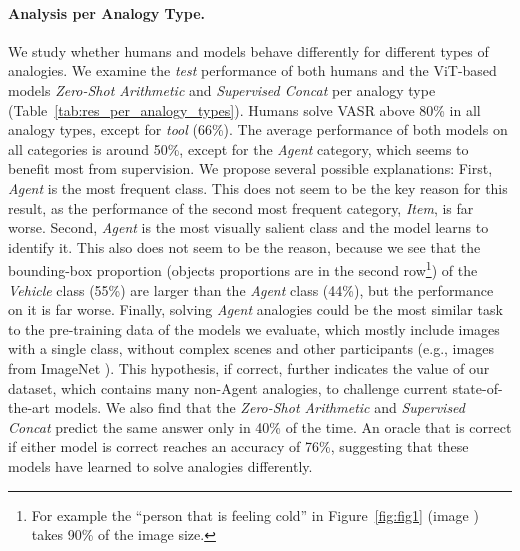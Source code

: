 \documentclass[letterpaper]{article} \usepackage{aaai23}  \usepackage{times}  \usepackage{helvet}  \usepackage{courier}  \usepackage[hyphens]{url}  \usepackage{graphicx} \urlstyle{rm} \def\UrlFont{\rm}  \usepackage{natbib}  \usepackage{caption} \frenchspacing  \setlength{\pdfpagewidth}{8.5in}  \setlength{\pdfpageheight}{11in}  \usepackage{algorithm}
\newcommand{\zeroshot}[0]{\emph{Zero-Shot Arithmetic}}
\newcommand{\trainedconcat}[0]{\emph{Supervised Concat}}
\begin{document}
\paragraph{Analysis per Analogy Type.} We study whether humans and models behave differently for different types of analogies. We examine the \textit{test} performance of both humans and the ViT-based models \zeroshot{} and \trainedconcat{} per analogy type (Table~\ref{tab:res_per_analogy_types}). Humans solve VASR above 80\% in all analogy types, except for \emph{tool} (66\%). 
The average performance of both models on all categories is around 50\%, except for the \emph{Agent} category, which seems to benefit most from supervision. We propose several possible explanations: First, \emph{Agent} is the most frequent class. This does not seem to be the key reason for this result, as the performance of the second most frequent category, \emph{Item}, is far worse. Second, \emph{Agent} is the most visually salient class and the model learns to identify it. This also does not seem to be the reason, because we see that the bounding-box proportion (objects proportions are in the second row\footnote{For example the ``person that is feeling cold'' in Figure~\ref{fig:fig1} (image ) takes 90\% of the image size.}) of the \emph{Vehicle} class (55\%) are larger than the \emph{Agent} class (44\%), but the performance on it is far worse. Finally, solving \emph{Agent} analogies could be the most similar task to the pre-training data of the models we evaluate, which mostly include images with a single class, without complex scenes and other participants (e.g., images from ImageNet \cite{deng2009imagenet}). This hypothesis, if correct, further indicates the value of our dataset, which contains many non-Agent analogies, to challenge current state-of-the-art models. We also find that the \zeroshot{} and \trainedconcat{} predict the same answer only in 40\% of the time. An oracle that is correct if either model is correct reaches an accuracy of 76\%, suggesting that these models have learned to solve analogies differently.
\end{document}
